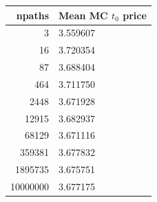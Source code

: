 \begin{tabular}{rl}
\toprule
npaths & Mean MC $t_0$ price \\
\midrule
3 & 3.559607 \\
16 & 3.720354 \\
87 & 3.688404 \\
464 & 3.711750 \\
2448 & 3.671928 \\
12915 & 3.682937 \\
68129 & 3.671116 \\
359381 & 3.677832 \\
1895735 & 3.675751 \\
10000000 & 3.677175 \\
\bottomrule
\end{tabular}
